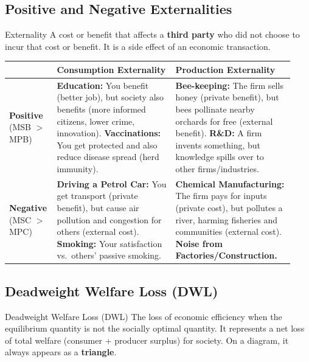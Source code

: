 \documentclass[11pt, a4paper, twoside]{book}
\begin{document}
\subsection{Positive and Negative Externalities}

\begin{keyterm}{Externality}
A cost or benefit that affects a \textbf{third party} who did not choose to incur that cost or benefit. It is a side effect of an economic transaction.
\end{keyterm}

\begin{example}
\begin{tabular}{@{}>{\RaggedRight\arraybackslash}p{0.13\linewidth}>{\RaggedRight\arraybackslash}p{0.4\linewidth}>{\RaggedRight\arraybackslash}p{0.4\linewidth}@{}}
 & \textbf{Consumption Externality} & \textbf{Production Externality} \\
\midrule
\textbf{Positive} (MSB $>$ MPB) & \textbf{Education:} You benefit (better job), but society also benefits (more informed citizens, lower crime, innovation). \textbf{Vaccinations:} You get protected and also reduce disease spread (herd immunity). & \textbf{Bee-keeping:} The firm sells honey (private benefit), but bees pollinate nearby orchards for free (external benefit). \textbf{R\&D:} A firm invents something, but knowledge spills over to other firms/industries. \\
\textbf{Negative} (MSC $>$ MPC) & \textbf{Driving a Petrol Car:} You get transport (private benefit), but cause air pollution and congestion for others (external cost). \textbf{Smoking:} Your satisfaction vs.\ others' passive smoking. & \textbf{Chemical Manufacturing:} The firm pays for inputs (private cost), but pollutes a river, harming fisheries and communities (external cost). \textbf{Noise from Factories/Construction.} \\
\end{tabular}
\end{example}

\subsection{Deadweight Welfare Loss (DWL)}

\begin{keyterm}{Deadweight Welfare Loss (DWL)}
The loss of economic efficiency when the equilibrium quantity is not the socially optimal quantity. It represents a net loss of total welfare (consumer + producer surplus) for society. On a diagram, it always appears as a \textbf{triangle}.
\end{keyterm}
\end{document}
